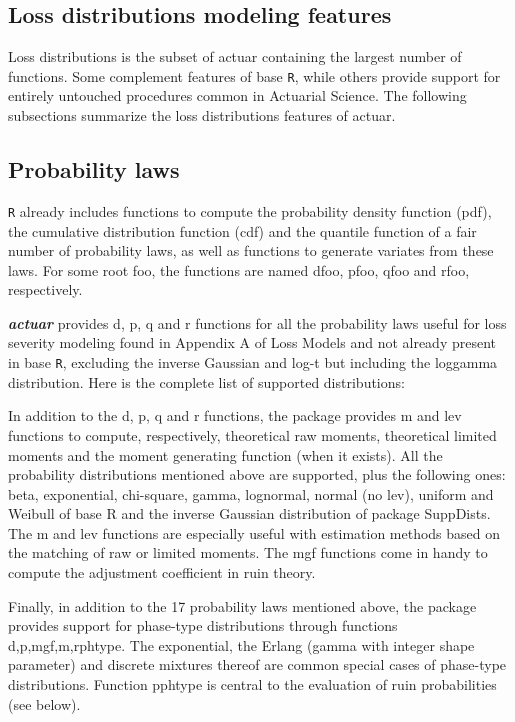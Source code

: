 \documentclass[12pt]{article}
\begin{document}
\subsection{Loss distributions modeling features}

Loss distributions is the subset of actuar containing the largest number of functions. Some complement features of base \texttt{R}, while others provide support for entirely untouched procedures common in Actuarial Science. The following subsections summarize the loss distributions features of actuar. 

\subsection{Probability laws}

\texttt{R} already includes functions to compute the probability density function (pdf), the cumulative distribution function (cdf) and the quantile function of a fair number of probability laws, as well as functions to generate variates from these laws. For some root foo, the functions are named dfoo, pfoo, qfoo and rfoo, respectively.

\textbf{\textit{actuar}} provides d, p, q and r functions for all the probability laws useful for loss severity modeling found in Appendix A of Loss Models and not already present in base \texttt{R}, excluding the inverse Gaussian and log-t but including the loggamma distribution. Here is the complete list of supported distributions:



In addition to the d, p, q and r functions, the package provides m and lev functions to compute, respectively, theoretical raw moments, theoretical limited moments and the moment generating function (when it exists). All the probability distributions mentioned above are supported, plus the following ones: beta, exponential, chi-square, gamma, lognormal, normal (no lev), uniform and Weibull of base R and the inverse Gaussian distribution of package SuppDists. The m and lev functions are especially useful with estimation methods based on the matching of raw or limited moments. The mgf functions come in handy to compute the adjustment coefficient in ruin theory.

Finally, in addition to the 17 probability laws mentioned above, the package provides support for phase-type distributions through functions {d,p,mgf,m,r}phtype. The exponential, the Erlang (gamma with integer shape parameter) and discrete mixtures thereof are common special cases of phase-type distributions. Function pphtype is central to the evaluation of ruin probabilities (see below).
\end{document}
